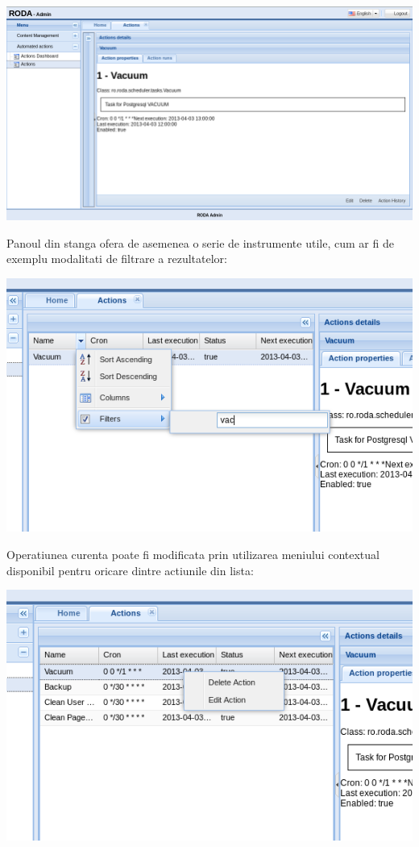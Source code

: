 \includegraphics[width=\textwidth]{actionsview-indexcollapsed}

Panoul din stanga ofera de asemenea o serie de instrumente utile,
cum ar fi de exemplu modalitati de filtrare a rezultatelor: 

\includegraphics[width=\textwidth]{actionsview-filters}

Operatiunea curenta poate fi modificata prin utilizarea meniului contextual
disponibil pentru oricare dintre actiunile din lista: 

\includegraphics[width=\textwidth]{actionsview-menu}

